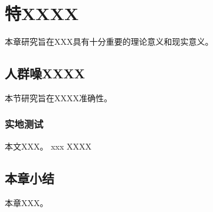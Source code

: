 
\chapter{特XXXX}

本章研究旨在XXX具有十分重要的理论意义和现实意义。


\section{人群噪XXXX}

本节研究旨在XXXX准确性。

\subsection{实地测试}
本文XXX。
xxx
XXXX
\FloatBarrier
\section{本章小结}
本章XXX。
